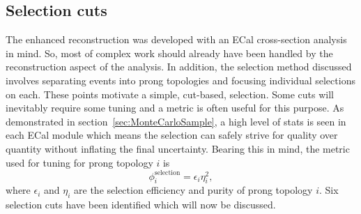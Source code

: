 \subsection{Selection cuts}
\label{subsec:SelectionCuts}
The enhanced reconstruction was developed with an ECal cross-section analysis in mind.  So, most of complex work should already have been handled by the reconstruction aspect of the analysis.  In addition, the selection method discussed involves separating events into prong topologies and focusing individual selections on each.  These points motivate a simple, cut-based, selection.  Some cuts will inevitably require some tuning and a metric is often useful for this purpose.  As demonstrated in section~\ref{sec:MonteCarloSample}, a high level of stats is seen in each ECal module which means the selection can safely strive for quality over quantity without inflating the final uncertainty.  Bearing this in mind, the metric used for tuning for prong topology $i$ is
\begin{equation}
  \phi_i^{\textrm{selection}} = \epsilon_i\eta^2_i,
  \label{eqn:SelectionMetric}
\end{equation}
where $\epsilon_i$ and $\eta_i$ are the selection efficiency and purity of prong topology $i$.  Six selection cuts have been identified which will now be discussed. 

